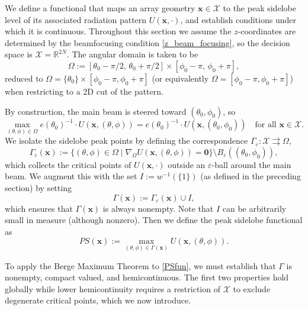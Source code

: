 \documentclass[11pt,letterpaper]{article}
\theoremstyle{definition}
\theoremstyle{plain}
\begin{document}
We define a functional that maps an array geometry $\mathbf{x} \in \mathcal{X}$ to the peak sidelobe level of its associated radiation pattern $U(\mathbf{x}, \cdot)$, and establish conditions under which it is continuous. Throughout this section we assume the $z$-coordinates are determined by the beamfocusing condition \eqref{z_beam_focusing}, so the decision space is $\mathcal{X} = \mathbb{R}^{2N}$. The angular domain is taken to be
\[
\Omega := [\theta_0 - \pi/2,\, \theta_0 + \pi/2] \times [\phi_0 - \pi,\, \phi_0 + \pi],
\]
reduced to $\Omega = \{\theta_0\} \times[\phi_0 - \pi, \phi_0 + \pi]$ (or equivalently $\Omega = [\phi_0 - \pi, \phi_0 + \pi]$)  when restricting to a 2D cut of the pattern.

By construction, the main beam is steered toward $(\theta_0, \phi_0)$, so
\[
\max_{(\theta,\phi) \in \Omega} e(\theta_0)^{-1}\cdot U(\mathbf{x}, (\theta, \phi)) = e(\theta_0)^{-1}\cdot U(\mathbf{x}, (\theta_0, \phi_0)) \quad \text{for all } \mathbf{x} \in \mathcal{X}.
\]
We isolate the sidelobe peak points by defining the correspondence $\Gamma_\varepsilon : \mathcal{X} \rightrightarrows \Omega$,
\begin{equation}\label{Gamma_eps}
\Gamma_\varepsilon(\mathbf{x}) := \bigl\{ (\theta, \phi) \in \Omega \mid \nabla_\Omega U(\mathbf{x}, (\theta, \phi)) = \mathbf{0} \bigr\} \setminus B_\varepsilon((\theta_0, \phi_0)),
\end{equation}
which collects the critical points of $U(\mathbf{x}, \cdot)$ outside an $\varepsilon$-ball around the main beam. We augment this with the set $I := w^{-1}(\{1\})$ (as defined in the preceding section) by setting
\[
\Gamma(\mathbf{x}) := \Gamma_\varepsilon(\mathbf{x}) \cup I,
\]
which ensures that $\Gamma(\mathbf{x})$ is always nonempty. Note that $I$ can be arbitrarily small in measure (although nonzero). Then we define the peak sidelobe functional as
\begin{equation}
    PS(\mathbf{x}) := \max_{(\theta,\phi) \in \Gamma(\mathbf{x})} U(\mathbf{x}, (\theta, \phi)).
    \label{PSfun}
\end{equation}

To apply the Berge Maximum Theorem to \eqref{PSfun}, we must establish that $\Gamma$ is nonempty, compact valued, and hemicontinuous. The first two properties hold globally while lower hemicontinuity requires a restriction of $\mathcal{X}$ to exclude degenerate critical points, which we now introduce.
\end{document}
